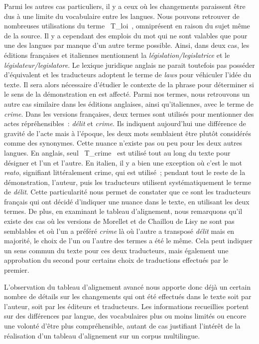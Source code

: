 Parmi les autres cas particuliers, il y a ceux où les changements paraissent être dus à une limite du vocabulaire entre les langues. Nous pouvons retrouver de nombreuses utilisations du terme \og~T\_loi~\fg{}, omniprésent en raison du sujet même de la source. Il y a cependant des emplois du mot qui ne sont valables que pour une des langues par manque d’un autre terme possible. Ainsi, dans deux cas, les éditions françaises et italiennes mentionnent la \textit{législation/legislatrice} et le \textit{législateur/legislatore}. Le lexique juridique anglais ne parait toutefois pas posséder d’équivalent et les traducteurs adoptent le terme de \textit{laws} pour véhiculer l’idée du texte. Il sera alors nécessaire d’étudier le contexte de la phrase pour déterminer si le sens de la démonstration en est affecté. Parmi nos termes, nous retrouvons un autre cas similaire dans les éditions anglaises, ainsi qu’italiennes, avec le terme de \textit{crime}. Dans les versions françaises, deux termes sont utilisés pour mentionner des actes répréhensibles~: \textit{délit} et \textit{crime}. Ils indiquent aujourd’hui une différence de gravité de l’acte mais à l’époque, les deux mots semblaient être plutôt considérés comme des synonymes. Cette nuance n’existe pas ou peu pour les deux autres langues. En anglais, seul \og~T\_crime~\fg{} est utilisé tout au long du texte pour désigner et l’un et l’autre. En italien, il y a bien une exception où c’est le mot \textit{reato}, signifiant littéralement crime, qui est utilisé~; pendant tout le reste de la démonstration, l’auteur, puis les traducteurs utilisent systématiquement le terme de \textit{délit}. Cette particularité nous permet de constater que ce sont les traducteurs français qui ont décidé d’indiquer une nuance dans le texte, en utilisant les deux termes. De plus, en examinant le tableau d’alignement, nous remarquons qu’il existe des cas où les versions de Morellet et de Chaillou de Lisy ne sont pas semblables et où l’un a préféré \textit{crime} là où l’autre a transposé \textit{délit} mais en majorité, le choix de l’un ou l’autre des termes a été le même. Cela peut indiquer un sens commun du texte pour ces deux traducteurs, mais également une approbation du second pour certains choix de traductions effectués par le premier.

L’observation du tableau d’alignement avancé nous apporte donc déjà un certain nombre de détails sur les changements qui ont été effectués dans le texte soit par l’auteur, soit par les éditeurs et traducteurs. Les informations recueillies portent sur des différences par langue, des vocabulaires plus ou moins limités ou encore une volonté d’être plus compréhensible, autant de cas justifiant l’intérêt de la réalisation d’un tableau d’alignement sur un corpus multilingue.

